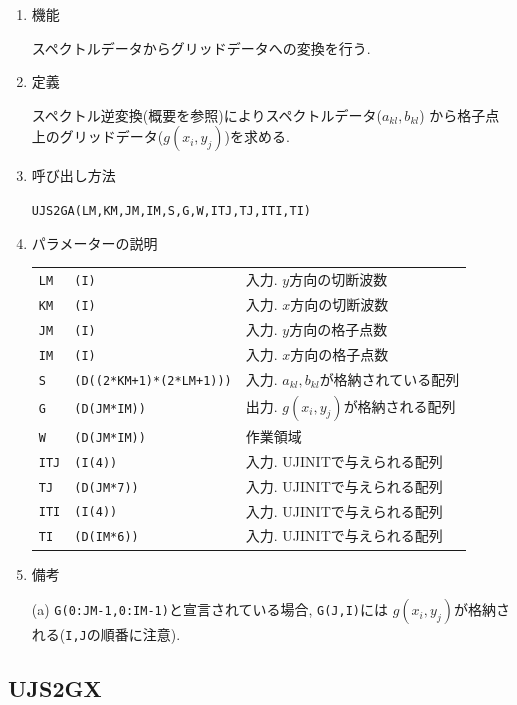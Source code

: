 \documentclass[a4j,fleqn]{jarticle}
\begin{document}
\begin{enumerate}

\item 機能 

スペクトルデータからグリッドデータへの変換を行う.

\item 定義

スペクトル逆変換(概要を参照)によりスペクトルデータ($a_{kl},b_{kl}$)
から格子点上のグリッドデータ($g(x_i,y_j)$)を求める.

\item 呼び出し方法 

{\tt UJS2GA(LM,KM,JM,IM,S,G,W,ITJ,TJ,ITI,TI)}
  
\item パラメーターの説明

\begin{tabular}{lll}
{\tt LM} & {\tt (I)} & 入力. $y$方向の切断波数\\
{\tt KM} & {\tt (I)} & 入力. $x$方向の切断波数\\
{\tt JM} & {\tt (I)} & 入力. $y$方向の格子点数\\
{\tt IM} & {\tt (I)} & 入力. $x$方向の格子点数\\
{\tt S} & {\tt (D((2*KM+1)*(2*LM+1)))} & 入力. $a_{kl},b_{kl}$が格納されている配列\\
{\tt G} & {\tt (D(JM*IM))} & 出力. $g(x_i,y_j)$が格納される配列\\
{\tt W} & {\tt (D(JM*IM))} & 作業領域\\
{\tt ITJ} & {\tt (I(4))} & 入力. UJINITで与えられる配列\\
{\tt TJ} & {\tt (D(JM*7))} & 入力. UJINITで与えられる配列\\
{\tt ITI} & {\tt (I(4))} & 入力. UJINITで与えられる配列\\
{\tt TI} & {\tt (D(IM*6))} & 入力. UJINITで与えられる配列
\end{tabular}

\item 備考

(a) {\tt G(0:JM-1,0:IM-1)}と宣言されている場合, {\tt G(J,I)}には
    $g(x_i,y_j)$が格納される({\tt I,J}の順番に注意).

\end{enumerate}


\subsection{UJS2GX}
\end{document}
